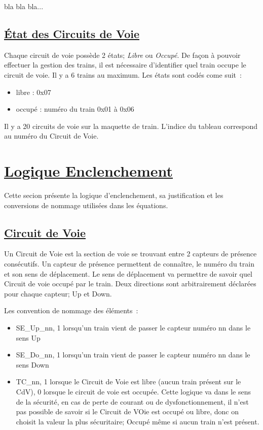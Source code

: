 bla bla bla...

  
\subsection{\underline{\'Etat des Circuits de Voie}}
\label{sec:st_sig}

Chaque circuit de voie possède 2 états; \emph{Libre} ou
\emph{Occupé}. De façon à pouvoir effectuer la gestion des trains, il
est nécessaire d'identifier quel train occupe le circuit de voie.
Il y a 6 trains au maximum. Les états sont codés come suit~:
\begin{itemize}
  \item libre : 0x07
  \item occupé : numéro du train 0x01 à 0x06
\end{itemize}  

Il y a 20 circuits de voie sur la maquette de train. L'indice du tableau 
correspond au numéro du Circuit de Voie.




\newpage
\section{\underline{Logique Enclenchement}}
\label{sec:log_enc}

Cette secion présente la logique d'enclenchement, sa justification et les 
conversions de nommage utilisées dans les équations.

\subsection{\underline{Circuit de Voie}}
\label{sec:CdV}

Un Circuit de Voie est la section de voie se trouvant entre 2 capteurs de présence
consécutifs. Un capteur de présence permettent de connaître, le numéro du train et
son sens de déplacement. Le sens de déplacement va permettre de savoir quel 
Circuit de voie occupé par le train. Deux directions sont arbitrairement déclarées
pour chaque capteur; Up et Down.

Les convention de nommage des éléments~:
\begin{itemize}
\item SE\_Up\_nn, 1 lorsqu'un train vient de passer le capteur numéro nn dans le sens Up
\item SE\_Do\_nn, 1 lorsqu'un train vient de passer le capteur numéro nn dans le sens Down
\item TC\_nn, 1 lorsque le Circuit de Voie est libre (aucun train présent sur le CdV), 0 lorsque 
le circuit de voie est occupée. Cette logique va dans le sens de la sécurité, en cas
de perte de courant ou de dysfonctionnement, il n'est pas possible de savoir si
le Circuit de VOie est occupé ou libre, donc on choisit la valeur la plus sécuritaire;
Occupé même si aucun train n'est présent.
\end{itemize}

